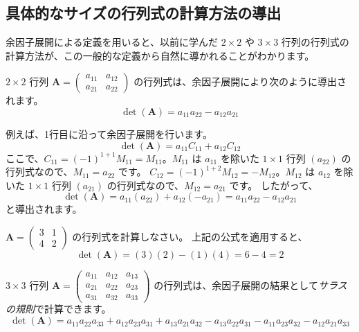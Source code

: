 \subsection{具体的なサイズの行列式の計算方法の導出}

余因子展開による定義を用いると、以前に学んだ $2 \times 2$ や $3 \times 3$ 行列の行列式の計算方法が、この一般的な定義から自然に導かれることがわかります。

\begin{thm}
$2 \times 2$ 行列 $\bm{A} = \begin{pmatrix} a_{11} & a_{12} \\ a_{21} & a_{22} \end{pmatrix}$ の行列式は、余因子展開により次のように導出されます。
\[ \det(\bm{A}) = a_{11}a_{22} - a_{12}a_{21} \]
\end{thm}

\begin{proof*}
例えば、1行目に沿って余因子展開を行います。
\[ \det(\bm{A}) = a_{11}C_{11} + a_{12}C_{12} \]
ここで、$C_{11} = (-1)^{1+1}M_{11} = M_{11}$。$M_{11}$ は $a_{11}$ を除いた $1 \times 1$ 行列 $(a_{22})$ の行列式なので、$M_{11} = a_{22}$ です。
$C_{12} = (-1)^{1+2}M_{12} = -M_{12}$。$M_{12}$ は $a_{12}$ を除いた $1 \times 1$ 行列 $(a_{21})$ の行列式なので、$M_{12} = a_{21}$ です。
したがって、
\[ \det(\bm{A}) = a_{11}(a_{22}) + a_{12}(-a_{21}) = a_{11}a_{22} - a_{12}a_{21} \]
と導出されます。
\end{proof*}

\begin{ex}
$\bm{A} = \begin{pmatrix} 3 & 1 \\ 4 & 2 \end{pmatrix}$ の行列式を計算しなさい。
上記の公式を適用すると、
\[ \det(\bm{A}) = (3)(2) - (1)(4) = 6 - 4 = 2 \]
\end{ex}

\begin{thm}
$3 \times 3$ 行列 $\bm{A} = \begin{pmatrix} a_{11} & a_{12} & a_{13} \\ a_{21} & a_{22} & a_{23} \\ a_{31} & a_{32} & a_{33} \end{pmatrix}$ の行列式は、余因子展開の結果として\emph{サラスの規則}で計算できます。
\[ \det(\bm{A}) = a_{11}a_{22}a_{33} + a_{12}a_{23}a_{31} + a_{13}a_{21}a_{32} - a_{13}a_{22}a_{31} - a_{11}a_{23}a_{32} - a_{12}a_{21}a_{33} \]
\end{thm}


